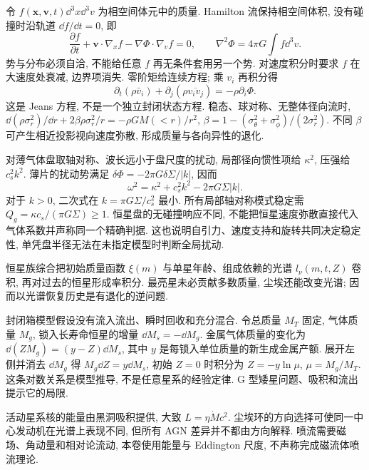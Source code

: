 \label{ch:distribution}
令 $f(\boldsymbol x,\boldsymbol v,t)\dd^3x\dd^3v$ 为相空间体元中的质量. Hamilton 流保持相空间体积, 没有碰撞时沿轨道 $\dd f/\dd t=0$, 即
\begin{equation}\label{eq:cbe}
\frac{\partial f}{\partial t}+\boldsymbol v\cdot\nabla_xf
-\nabla\Phi\cdot\nabla_vf=0,\qquad
\nabla^2\Phi=4\pi G\int f\dd^3v.
\end{equation}
势与分布必须自洽, 不能给任意 $f$ 再无条件套用另一个势. 对速度积分时要求 $f$ 在大速度处衰减, 边界项消失. 零阶矩给连续方程; 乘 $v_i$ 再积分得
\begin{equation}
\partial_t(\rho\bar v_i)+\partial_j(\rho\overline{v_iv_j})
=-\rho\partial_i\Phi.
\end{equation}
这是 Jeans 方程, 不是一个独立封闭状态方程. 稳态、球对称、无整体径向流时,
$\dd(\rho\sigma_r^2)/\dd r+2\beta\rho\sigma_r^2/r=-\rho GM(<r)/r^2$,
$\beta=1-(\sigma_\theta^2+\sigma_\phi^2)/(2\sigma_r^2)$. 不同 $\beta$ 可产生相近投影视向速度弥散, 形成质量与各向异性的退化.

对薄气体盘取轴对称、波长远小于盘尺度的扰动, 局部径向惯性项给 $\kappa^2$, 压强给 $c_s^2k^2$. 薄片的扰动势满足 $\delta\Phi=-2\pi G\delta\Sigma/|k|$, 因而
\begin{equation}
\omega^2=\kappa^2+c_s^2k^2-2\pi G\Sigma|k|.
\end{equation}
对于 $k>0$, 二次式在 $k=\pi G\Sigma/c_s^2$ 最小. 所有局部轴对称模式稳定需 $Q_g=\kappa c_s/(\pi G\Sigma)\ge1$. 恒星盘的无碰撞响应不同, 不能把恒星速度弥散直接代入气体系数并声称同一个精确判据. 这也说明自引力、速度支持和旋转共同决定稳定性, 单凭盘半径无法在未指定模型时判断全局扰动.

恒星族综合把初始质量函数 $\xi(m)$ 与单星年龄、组成依赖的光谱 $l_\nu(m,t,Z)$ 卷积, 再对过去的恒星形成率积分. 最亮星未必贡献多数质量, 尘埃还能改变光谱; 因而以光谱恢复历史是有退化的逆问题.

封闭箱模型假设没有流入流出、瞬时回收和充分混合. 令总质量 $M_T$ 固定, 气体质量 $M_g$, 锁入长寿命恒星的增量 $\dd M_s=-\dd M_g$. 金属气体质量的变化为 $\dd(ZM_g)=(y-Z)\dd M_s$, 其中 $y$ 是每锁入单位质量的新生成金属产额. 展开左侧并消去 $\dd M_g$ 得 $M_g\dd Z=y\dd M_s$, 初始 $Z=0$ 时积分为 $Z=-y\ln\mu$, $\mu=M_g/M_T$. 这条对数关系是模型推导, 不是任意星系的经验定律. G 型矮星问题、吸积和流出提示它的局限.

活动星系核的能量由黑洞吸积提供, 大致 $L=\eta\dot Mc^2$. 尘埃环的方向选择可使同一中心发动机在光谱上表现不同, 但所有 AGN 差异并不都由方向解释. 喷流需要磁场、角动量和相对论流动, 本卷使用能量与 Eddington 尺度, 不声称完成磁流体喷流理论.

